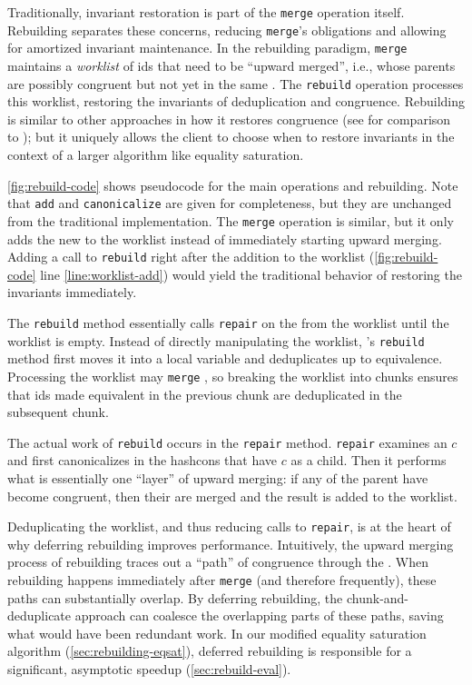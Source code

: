 Traditionally, invariant restoration is part of the
  \texttt{merge} operation itself.
Rebuilding separates these concerns,
  reducing \texttt{merge}'s obligations
  and allowing for amortized invariant maintenance.
In the rebuilding paradigm,
  \texttt{merge} maintains a \textit{worklist} of \eclass ids that need to
  be ``upward merged'', i.e., \eclasses whose parents are possibly congruent but
  not yet in the same \eclass.
The \texttt{rebuild} operation processes this worklist, restoring the invariants
  of deduplication and congruence.
Rebuilding is similar to other approaches in how it restores congruence
  (see  for comparison to \cite{downey-cse});
  but it uniquely allows the client to choose when to restore invariants in the
  context of a larger algorithm like equality saturation.

\autoref{fig:rebuild-code} shows pseudocode for the main \egraph operations and
  rebuilding.
Note that \texttt{add} and \texttt{canonicalize} are given for completeness, but
  they are unchanged from the traditional \egraph implementation.
The \texttt{merge} operation is similar, but it only adds the new \eclass to the
  worklist instead of immediately starting upward merging.
Adding a call to \texttt{rebuild} right after the addition to
  the worklist (\autoref{fig:rebuild-code} line \ref{line:worklist-add})
  would yield the traditional behavior of restoring the invariants immediately.

The \texttt{rebuild} method essentially calls \texttt{repair} on the \eclasses
  from the worklist until the worklist is empty.
Instead of directly manipulating the worklist, \egg's \texttt{rebuild} method
  first moves it into a local variable and deduplicates \eclasses
  up to equivalence.
Processing the worklist may \texttt{merge} \eclasses,
  so breaking the worklist into chunks ensures that \eclass ids made
  equivalent in the previous chunk are deduplicated in the subsequent chunk.

The actual work of \texttt{rebuild} occurs in the \texttt{repair} method.
\texttt{repair} examines an \eclass $c$ and first canonicalizes \enodes in the
  hashcons that have $c$ as a child.
Then it performs what is essentially one ``layer'' of upward
  merging:
if any of the parent \enodes have become congruent, then their
  \eclasses are merged and the result is added to the worklist.

Deduplicating the worklist, and thus reducing calls to \texttt{repair},
  is at the heart of why deferring rebuilding improves
  performance.
Intuitively, the upward merging process of rebuilding traces out a ``path'' of
  congruence through the \egraph.
When rebuilding happens immediately after \texttt{merge}
  (and therefore frequently), these paths can substantially overlap.
By deferring rebuilding, the chunk-and-deduplicate approach can coalesce the
overlapping parts of these paths, saving what would have been redundant work.
In our modified equality saturation algorithm (\autoref{sec:rebuilding-eqsat}),
  deferred rebuilding is responsible for a significant, asymptotic speedup
  (\autoref{sec:rebuild-eval}).

